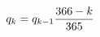 \documentclass[preview]{standalone}
\begin{document}
\begin{align*}
\special{dvisvgm:raw <g id='unique000'>}q_k=q_{k-1}\frac{366-k}{365}\special{dvisvgm:raw </g>}
\end{align*}
\end{document}
